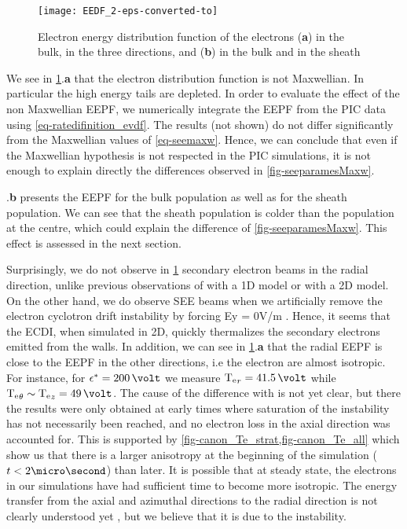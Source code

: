  \begin{figure}[hbtp]
   \centering
   \texttt{[image: EEDF\_2-eps-converted-to]}
   \caption{Electron energy distribution function of the electrons ({\bf a}) in the bulk, in the three directions, and ({\bf b}) in the bulk and in the sheath}
   \label{fig-EEDF}
 \end{figure}
 
 We see in \cref{fig-EEDF}.{\bf a} that the electron distribution function is not Maxwellian.
 In particular the high energy tails are depleted.
 In order to evaluate the effect of the non Maxwellian EEPF, we numerically integrate the EEPF from the PIC data using \vref{eq-ratedifinition_evdf}.
The results (not shown) do not differ significantly from the Maxwellian values of \vref{eq-seemaxw}.
Hence, we can conclude that even if the Maxwellian hypothesis is not respected in the PIC simulations, it is not enough to explain directly the differences observed in \vref{fig-seeparamesMaxw}.


.{\bf b} presents the EEPF for the bulk population as well as for the sheath population.
 We can see that the sheath population is colder than the population at the centre, which could explain the difference of \vref{fig-seeparamesMaxw}. 
 This effect is assessed in the next section.

 Surprisingly, we do not observe in \cref{fig-EEDF} secondary electron beams in the radial  direction, unlike previous observations of \citet{sydorenko2006} with a 1D model or \citet{heron2013} with a 2D model.
 On the other hand, we do observe SEE beams when  we artificially remove the electron cyclotron drift instability by forcing Ey = 0V/m \citep{croes2017}.
 Hence, it seems that the ECDI, when simulated in 2D, quickly thermalizes the secondary electrons emitted from the walls.
 In addition, we can see in \cref{fig-EEDF}.{\bf a} that the radial EEPF is close to the EEPF in the other directions, i.e the electron are almost isotropic.
 For instance, for $\crover = 200\,\volt$  we measure $\Te_r = 41.5\,\volt$ while $\Te_{\theta} \sim \Te_z = 49\,\volt$.
 The cause of the difference with \citet{heron2013} is not yet clear, but there the results were only obtained at early times where saturation of the instability has not necessarily been reached, and no electron loss in  the axial direction was accounted for.
 This is supported by \cref{fig-canon_Te_strat,fig-canon_Te_all} which show us that there is a larger anisotropy at the beginning of the simulation ($t<2\micro\second$) than later.
 It is possible that at steady state, the electrons in our simulations have had sufficient time to become more isotropic.
 The energy transfer from the axial and azimuthal directions to the radial direction is not clearly understood
 yet \citep{janhunen2018}, but we believe that it is due to the instability.



